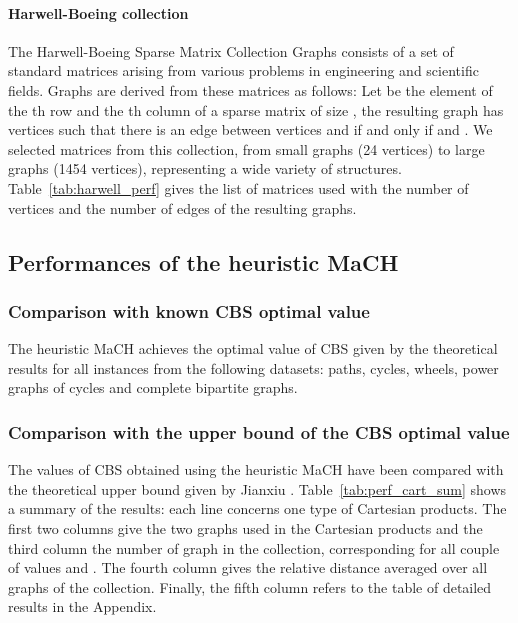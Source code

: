 \documentclass{scrartcl}
\theoremstyle{plain}
\newcommand{\algo}{MaCH}
\newcommand{\cbs}{CBS}
\begin{document}
\paragraph{\textbf{Harwell-Boeing collection}}
The Harwell-Boeing Sparse Matrix Collection Graphs \cite{Duff1992} consists of 
a set of standard matrices arising from various problems in engineering and 
scientific fields. Graphs are derived from these matrices as follows: Let 
 be the element of the th row and the th column of a sparse matrix 
 of size , the resulting graph has  vertices such that there 
is an edge between vertices  and  if and only if  and 
. We selected  matrices from this collection, from small graphs (24 
vertices) to large graphs (1454 vertices), representing a wide variety of 
structures. Table~\ref{tab:harwell_perf} gives the list of matrices used with 
the 
number of vertices and the number of edges of the resulting graphs.

\subsection{Performances of the heuristic \algo{}}

\subsubsection{Comparison with known \cbs{} optimal value}

The heuristic \algo{} achieves the optimal value of \cbs{} given by the 
theoretical results for all instances from the following datasets: paths, 
cycles, wheels, power graphs of cycles and complete bipartite graphs.

\subsubsection{Comparison with the upper bound of the \cbs{} optimal value}

The values of \cbs{} obtained using the heuristic \algo{} have been compared 
with the theoretical upper bound given by Jianxiu \cite{Jianxiu2001}. 
Table~\ref{tab:perf_cart_sum} shows a summary of the results: each line concerns 
one type of Cartesian products. The first two columns give the two graphs used 
in the Cartesian products and the third column the number of graph in the 
collection, corresponding for all couple of values  and . The fourth 
column gives the relative distance averaged over all graphs of the collection. 
Finally, the fifth column refers to the table of detailed results in the 
Appendix. 
\end{document}
